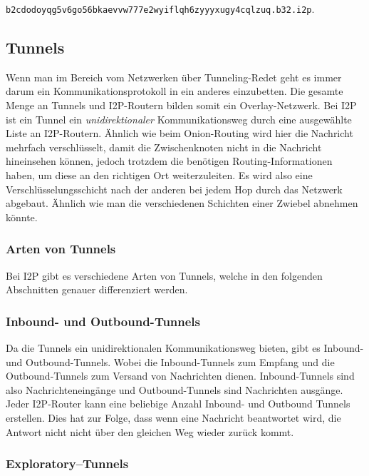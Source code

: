\lstinline|b2cdodoyqg5v6go56bkaevvw777e2wyiflqh6zyyyxugy4cqlzuq.b32.i2p|.

\subsection{Tunnels}

Wenn man im Bereich vom Netzwerken über Tunneling-Redet geht es immer darum ein Kommunikationsprotokoll in ein anderes einzubetten. \parencite{noauthor_duden_nodate}
Die gesamte Menge an Tunnels und I2P-Routern bilden somit ein Overlay-Netzwerk.
Bei I2P ist ein Tunnel ein \textit{unidirektionaler} Kommunikationsweg durch eine ausgewählte Liste an I2P-Routern.
Ähnlich wie beim Onion-Routing wird hier die Nachricht mehrfach verschlüsselt, damit die Zwischenknoten nicht in die Nachricht hineinsehen können, jedoch trotzdem die benötigen Routing-Informationen haben, um diese an den richtigen Ort weiterzuleiten.
Es wird also eine Verschlüsselungsschicht nach der anderen bei jedem Hop durch das Netzwerk abgebaut.
Ähnlich wie man die verschiedenen Schichten einer Zwiebel abnehmen könnte.
\cite{noauthor_intro_nodate}

\subsubsection{Arten von Tunnels}

Bei I2P gibt es verschiedene Arten von Tunnels, welche in den folgenden Abschnitten genauer differenziert werden.

\subsubsection{Inbound- und Outbound-Tunnels}
Da die Tunnels ein unidirektionalen Kommunikationsweg bieten, gibt es Inbound- und Outbound-Tunnels.
Wobei die Inbound-Tunnels zum Empfang und die Outbound-Tunnels zum Versand von Nachrichten dienen.
Inbound-Tunnels sind also Nachrichteneingänge und Outbound-Tunnels sind Nachrichten ausgänge.
Jeder I2P-Router kann eine beliebige Anzahl Inbound- und Outbound Tunnels erstellen.
Dies hat zur Folge, dass wenn eine Nachricht beantwortet wird, die Antwort nicht nicht über den gleichen Weg wieder zurück kommt.
\cite{noauthor_intro_nodate}

\subsubsection{Exploratory--Tunnels}

